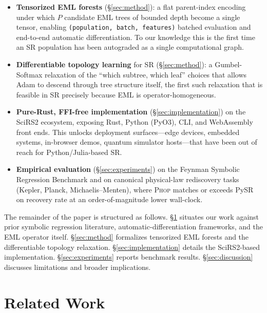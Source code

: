 \documentclass{article}
\begin{document}
\begin{itemize}
  \item \textbf{Tensorized EML forests} (\S\ref{sec:method}): a flat
        parent-index encoding under which $P$ candidate EML trees of
        bounded depth become a single tensor, enabling
        \texttt{(population, batch, features)} batched evaluation and
        end-to-end automatic differentiation. To our knowledge this is
        the first time an SR population has been autograded as a
        single computational graph.
  \item \textbf{Differentiable topology learning} for SR
        (\S\ref{sec:method}): a Gumbel-Softmax relaxation of the
        ``which subtree, which leaf'' choices that allows Adam to
        descend through tree structure itself, the first such
        relaxation that is feasible in SR precisely because EML is
        operator-homogeneous.
  \item \textbf{Pure-Rust, FFI-free implementation}
        (\S\ref{sec:implementation}) on the SciRS2 ecosystem, exposing
        Rust, Python (PyO3), CLI, and WebAssembly front ends. This
        unlocks deployment surfaces—edge devices, embedded systems,
        in-browser demos, quantum simulator hosts—that have been out
        of reach for Python/Julia-based SR.
  \item \textbf{Empirical evaluation} (\S\ref{sec:experiments}) on the
        Feynman Symbolic Regression Benchmark and on canonical
        physical-law rediscovery tasks (Kepler, Planck,
        Michaelis--Menten), where \textsc{Phop} matches or exceeds
        PySR on recovery rate at an order-of-magnitude lower wall-clock.
\end{itemize}

The remainder of the paper is structured as follows.
\S\ref{sec:related} situates our work against prior symbolic regression
literature, automatic-differentiation frameworks, and the EML operator
itself. \S\ref{sec:method} formalizes tensorized EML forests and the
differentiable topology relaxation. \S\ref{sec:implementation} details
the SciRS2-based implementation. \S\ref{sec:experiments} reports
benchmark results. \S\ref{sec:discussion} discusses limitations and
broader implications.

\section{Related Work}
\label{sec:related}
\end{document}
